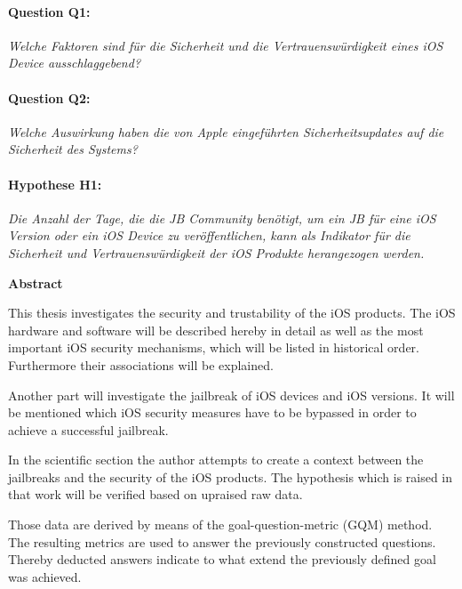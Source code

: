 \paragraph{Question Q1:} \textit{\glqq Welche Faktoren sind für die Sicherheit und die Vertrauenswürdigkeit eines iOS Device ausschlaggebend?\grqq{}}
\paragraph{Question Q2:} \textit{\glqq Welche Auswirkung haben die von Apple eingeführten Sicherheitsupdates auf die Sicherheit des Systems?\grqq{}}        
\paragraph{Hypothese H1:}\textit{\glqq Die Anzahl der Tage, die die JB Community benötigt, um ein JB für eine iOS Version oder ein iOS Device zu veröffentlichen, kann als Indikator für die Sicherheit und Vertrauenswürdigkeit der iOS Produkte herangezogen werden.\grqq{}}




\cleardoublepage


\begin{center}
{\Large\bfseries Abstract}
\end{center}
This thesis investigates the security and trustability of the iOS products. The iOS hardware and software will be described hereby in detail as well as the most important iOS security mechanisms, which will be listed in historical order. Furthermore their associations will be explained.  \par
Another part will investigate the jailbreak of iOS devices and iOS versions. It will be mentioned which iOS security measures have to be bypassed in order to achieve a successful jailbreak. \par 
In the scientific section the author attempts to create a context between the jailbreaks and the security of the iOS products. The hypothesis which is raised in that work will be verified based on upraised raw data.  \par
Those data are derived by means of the goal-question-metric (GQM) method. The resulting metrics are used to answer the previously constructed questions. Thereby deducted answers indicate to what extend the previously defined goal was achieved.  \par

